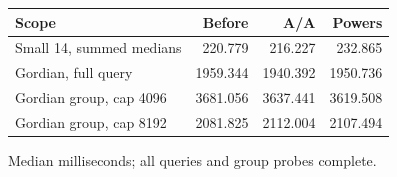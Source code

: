 \begin{center}\small
\begin{tabular}{@{}lrrr@{}}
\toprule
Scope & Before & A/A & Powers \\
\midrule
Small 14, summed medians & 220.779 & 216.227 & 232.865 \\
Gordian, full query & 1959.344 & 1940.392 & 1950.736 \\
Gordian group, cap 4096 & 3681.056 & 3637.441 & 3619.508 \\
Gordian group, cap 8192 & 2081.825 & 2112.004 & 2107.494 \\
\bottomrule
\end{tabular}
\end{center}
Median milliseconds; all queries and group probes complete.
